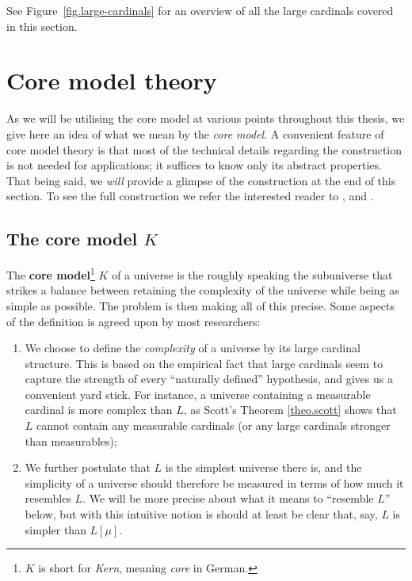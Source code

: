 \documentclass[../../main]{subfiles}
\begin{document}

See Figure~\ref{fig.large-cardinals} for an overview of all the large cardinals covered in this section.



\section{Core model theory}
\label{prelims.core-model-theory}

As we will be utilising the core model at various points throughout this thesis, we give here an idea of what we mean by the \textit{core model}. A convenient feature of core model theory is that most of the technical details regarding the construction is not needed for applications; it suffices to know only its abstract properties. That being said, we \textit{will} provide a glimpse of the construction at the end of this section. To see the full construction we refer the interested reader to \cite{MSc}, \cite{Zeman} and \cite{Kwithoutmeasurable}. 


\subsection{The core model $K$}

The \textbf{core model}\footnote{$K$ is short for \textit{Kern}, meaning \textit{core} in German.} $K$ of a universe is the roughly speaking the subuniverse that strikes a balance between retaining the complexity of the universe while being as simple as possible. The problem is then making all of this precise. Some aspects of the definition is agreed upon by most researchers:
\begin{enumerate}
  \item We choose to define the \textit{complexity} of a universe by its large cardinal structure. This is based on the empirical fact that large cardinals seem to capture the strength of every ``naturally defined'' hypothesis, and gives us a convenient yard stick. For instance, a universe containing a measurable cardinal is more complex than $L$, as Scott's Theorem \ref{theo.scott} shows that $L$ cannot contain any measurable cardinals (or any large cardinals stronger than measurables);
  \item We further postulate that $L$ is the simplest universe there is, and the simplicity of a universe should therefore be measured in terms of how much it resembles $L$. We will be more precise about what it means to ``resemble $L$'' below, but with this intuitive notion is should at least be clear that, say, $L$ is simpler than $L[\mu]$.\\
\end{enumerate}
\end{document}
